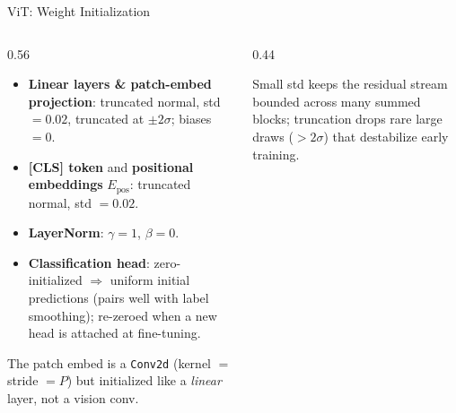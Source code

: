 \begin{frame}{ViT: Weight Initialization}
  \begin{columns}[c]
    \begin{column}{0.56\textwidth}
      \begin{itemize}
        \item \textbf{Linear layers \& patch-embed projection}: truncated normal, std $=0.02$, truncated at $\pm 2\sigma$; biases $=0$.
        \item \textbf{[CLS] token} and \textbf{positional embeddings} $E_\text{pos}$: truncated normal, std $=0.02$.
        \item \textbf{LayerNorm}: $\gamma=1$, $\beta=0$.
        \item \textbf{Classification head}: zero-initialized $\Rightarrow$ uniform initial predictions (pairs well with label smoothing); re-zeroed when a new head is attached at fine-tuning.
      \end{itemize}
      \vspace{0.3em}
      \footnotesize
      The patch embed is a \texttt{Conv2d} (kernel $=$ stride $=P$) but initialized like a \emph{linear} layer, not a vision conv.
    \end{column}
    \begin{column}{0.44\textwidth}
      \begin{center}
      \end{center}
      \footnotesize
      Small std keeps the residual stream bounded across many summed blocks; truncation drops rare large draws ($>2\sigma$) that destabilize early training.
    \end{column}
  \end{columns}
\end{frame}

